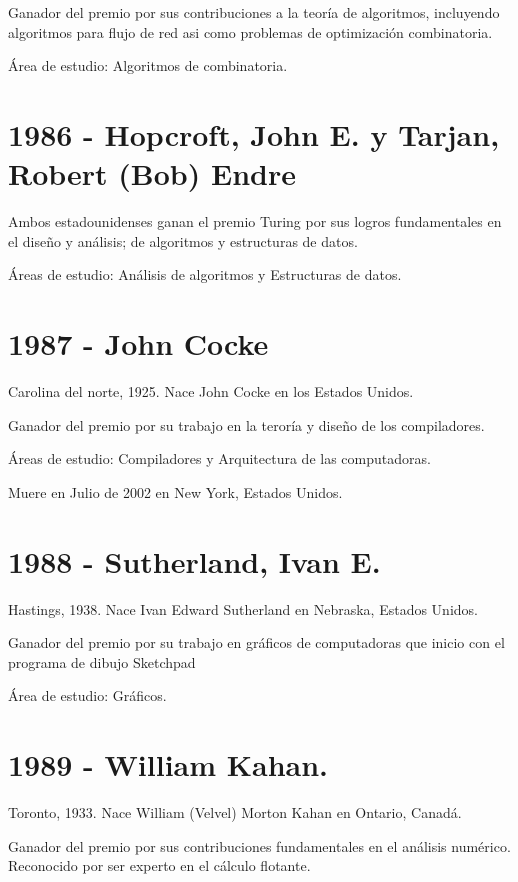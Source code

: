 \documentclass[a4paper, 11pt]{article}
\begin{document}
\noindent Ganador del premio por sus contribuciones a la teoría de algoritmos, incluyendo algoritmos para flujo de red asi como problemas de optimización combinatoria.

\noindent Área de estudio: Algoritmos de combinatoria.
\newline

\section*{1986 - Hopcroft, John E. y Tarjan, Robert (Bob) Endre}
\noindent Ambos estadounidenses ganan el premio Turing por sus logros fundamentales en el diseño y análisis; de algoritmos y estructuras de datos.

\noindent Áreas de estudio: Análisis de algoritmos y Estructuras de datos.
\newline

\section*{1987 - John Cocke}
\noindent Carolina del norte, 1925. Nace John Cocke en los Estados Unidos.

\noindent Ganador del premio por su trabajo en la teroría y diseño de los compiladores.

\noindent Áreas de estudio: Compiladores y Arquitectura de las computadoras.

\noindent Muere en Julio de 2002 en New York, Estados Unidos.
\newline

\section*{1988 - Sutherland, Ivan E.}
\noindent Hastings, 1938. Nace Ivan Edward Sutherland en Nebraska, Estados Unidos.

\noindent Ganador del premio por su trabajo en gráficos de computadoras que inicio con el programa de dibujo Sketchpad

\noindent Área de estudio: Gráficos.
\newline

\section*{1989 - William Kahan.}
\noindent Toronto, 1933. Nace William (Velvel) Morton Kahan en Ontario, Canadá.

\noindent Ganador del premio por sus contribuciones fundamentales en el análisis numérico. Reconocido por ser experto en el cálculo flotante.
\end{document}
